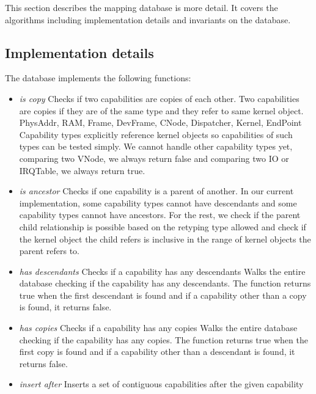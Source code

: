 \documentclass{scrreprt}
\begin{document}
  This section describes the mapping database is more detail.
  It covers the algorithms including implementation details
  and invariants on the database.

  \subsection{Implementation details}

  The database implements the following functions:
  \begin{itemize}
    \item \emph{is copy} Checks if two capabilities are copies of each other.
      Two capabilities are copies if they are of the same type
      and they refer to same kernel object.
      PhysAddr, RAM, Frame, DevFrame, CNode, Dispatcher, Kernel, EndPoint
      Capability types explicitly reference kernel objects
      so capabilities of such types can be tested simply.
      We cannot handle other capability types yet,
      comparing two VNode, we always return false
      and comparing two IO or IRQTable, we always return true.

    \item \emph{is ancestor} Checks if one capability is a parent of another.
      In our current implementation, some capability types cannot have descendants
      and some capability types cannot have ancestors.
      For the rest, we check if the parent child relationship is possible
      based on the retyping type allowed
      and check if the kernel object the child refers is inclusive
      in the range of kernel objects the parent refers to.

    \item \emph{has descendants} Checks if a capability has any descendants
      Walks the entire database checking if the capability has any descendants.
      The function returns true when the first descendant is found
      and if a capability other than a copy is found, it returns false.

    \item \emph{has copies} Checks if a capability has any copies
      Walks the entire database checking if the capability has any copies.
      The function returns true when the first copy is found
      and if a capability other than a descendant is found, it returns false.

    \item \emph{insert after} Inserts a set of contiguous capabilities
      after the given capability


\end{itemize}
\end{document}
